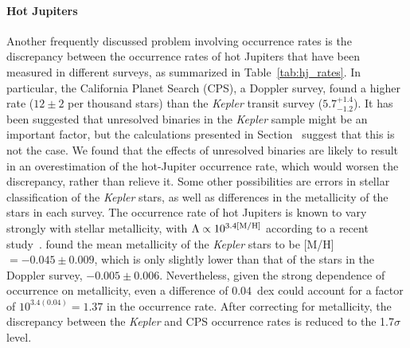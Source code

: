 \documentclass[12pt,modern,trackchanges]{aastex61}
\begin{document}
\paragraph{Hot Jupiters} Another frequently discussed problem
involving occurrence rates is the discrepancy between the occurrence
rates of hot Jupiters that have been measured in different surveys, as
summarized in Table~\ref{tab:hj_rates}.  In particular, the California
Planet Search (CPS), a Doppler survey, found a higher rate ($12\pm 2$
per thousand stars) than the {\it Kepler} transit survey
($5.7^{+1.4}_{-1.2}$).  It has been suggested that unresolved binaries
in the {\it Kepler} sample might be an important factor, but the
calculations presented in 
Section~\added{\ref{sec:hjs}}\deleted{\ref{sec:further_models}} suggest
that this is not the case.  We found that the effects of unresolved
binaries are likely to result in an overestimation of the hot-Jupiter
occurrence rate, which would worsen the discrepancy, rather than
relieve it. Some other possibilities are errors in stellar
classification of the {\it Kepler} stars, as well as differences in
the metallicity of the stars in each survey.  The occurrence rate of
hot Jupiters is known to vary strongly with stellar metallicity, with
$\Lambda \propto 10^{3.4{\rm [M/H]}}$ according to a recent
study~\citep{petigura_CKS_2017}.  \citet{guo_metallicity_2017} found
the mean metallicity of the {\it Kepler} stars to be [M/H]~$=-0.045\pm
0.009$, which is only slightly lower than that of the stars in the
Doppler survey, $-0.005\pm 0.006$.  Nevertheless, given the strong
dependence of occurrence on metallicity, even a difference of
$0.04$~dex could account for a factor of $10^{3.4(0.04)} = 1.37$
in the occurrence rate.  After correcting for metallicity, the
discrepancy between the {\it Kepler} and CPS occurrence rates is
reduced to the 1.7$\sigma$ level.
\end{document}
